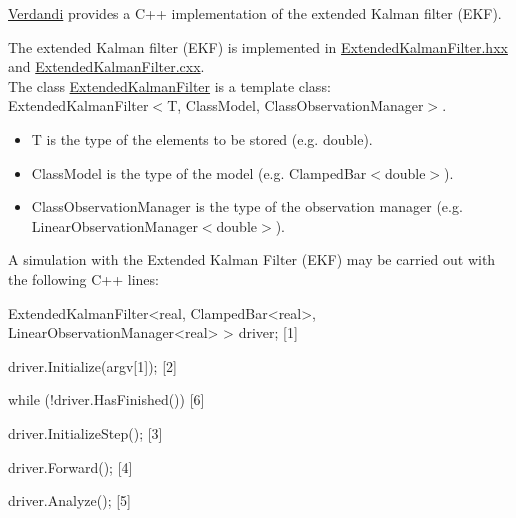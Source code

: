 \documentclass{tufte-book}
\begin{document}
  \hyperlink{namespace_verdandi}{\-Verdandi} provides a \-C++ implementation of the extended \-Kalman filter (\-E\-K\-F).

\-The extended \-Kalman filter (\-E\-K\-F) is implemented in {\ttfamily \hyperlink{_extended_kalman_filter_8hxx_source}{\-Extended\-Kalman\-Filter.\-hxx}} and {\ttfamily \hyperlink{_extended_kalman_filter_8cxx_source}{\-Extended\-Kalman\-Filter.\-cxx}}.\\
 \-The class {\ttfamily  \hyperlink{class_verdandi_1_1_extended_kalman_filter}{\-Extended\-Kalman\-Filter}} is a template class\-:\\
  {\ttfamily \-Extended\-Kalman\-Filter$<$\-T, Class\-Model, Class\-Observation\-Manager$>$}.
  \begin{itemize}
  \item {\ttfamily \-T} is the type of the elements to be stored (e.\-g. {\ttfamily double}).
  \item {\ttfamily \-Class\-Model} is the type of the model (e.\-g. {\ttfamily \-Clamped\-Bar$<$double$>$}).
  \item {\ttfamily \-Class\-Observation\-Manager} is the type of the observation manager (e.\-g. {\ttfamily \-Linear\-Observation\-Manager$<$double$>$}).
  \end{itemize}

\-A simulation with the \-Extended \-Kalman \-Filter (\-E\-K\-F) may be carried out with the following \-C++ lines\-:

 \begin{frame_cpp}
ExtendedKalmanFilter<real, ClampedBar<real>,
        LinearObservationManager<real> > driver; [1]

driver.Initialize(argv[1]); [2]

while (!driver.HasFinished()) [6]
{
    driver.InitializeStep(); [3]

    driver.Forward(); [4]

    driver.Analyze(); [5]
}
\end{frame_cpp}
\end{document}
